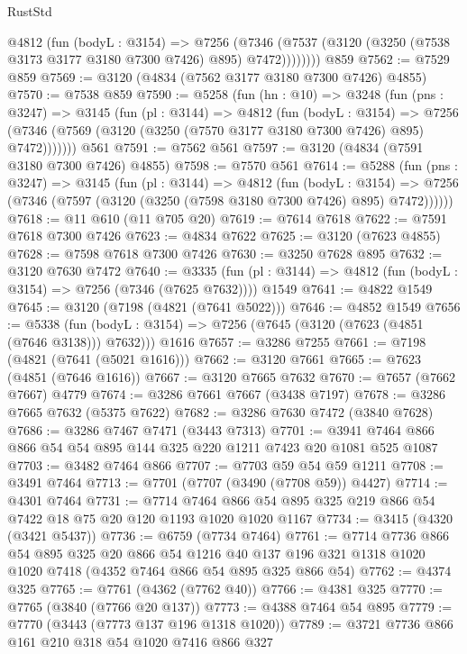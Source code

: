 \begin{lexlean}{RustStd}
\begin{coremodule}
{\begin{coremodule}
{{{{{{{{{{{{{{{{{{{{{{{{{{          @4812
            (fun (bodyL : @3154) =>
            @7256
              (@7346 (@7537 (@3120 (@3250 (@7538 @3173 @3177 @3180 @7300 @7426) @895) @7472))))))))
    @859
@7562 := @7529 @859
@7569 := @3120 (@4834 (@7562 @3177 @3180 @7300 @7426) @4855)
@7570 := @7538 @859
@7590 := @5258
    (fun (hn : @10) =>
    @3248
      (fun (pns : @3247) =>
      @3145
        (fun (pl : @3144) =>
        @4812
          (fun (bodyL : @3154) =>
          @7256 (@7346 (@7569 (@3120 (@3250 (@7570 @3177 @3180 @7300 @7426) @895) @7472)))))))
    @561
@7591 := @7562 @561
@7597 := @3120 (@4834 (@7591 @3180 @7300 @7426) @4855)
@7598 := @7570 @561
@7614 := @5288
    (fun (pns : @3247) =>
    @3145
      (fun (pl : @3144) =>
      @4812
        (fun (bodyL : @3154) =>
        @7256 (@7346 (@7597 (@3120 (@3250 (@7598 @3180 @7300 @7426) @895) @7472))))))
@7618 := @11 @610 (@11 @705 @20)
@7619 := @7614 @7618
@7622 := @7591 @7618 @7300 @7426
@7623 := @4834 @7622
@7625 := @3120 (@7623 @4855)
@7628 := @7598 @7618 @7300 @7426
@7630 := @3250 @7628 @895
@7632 := @3120 @7630 @7472
@7640 := @3335
    (fun (pl : @3144) => @4812 (fun (bodyL : @3154) => @7256 (@7346 (@7625 @7632))))
    @1549
@7641 := @4822 @1549
@7645 := @3120 (@7198 (@4821 (@7641 @5022)))
@7646 := @4852 @1549
@7656 := @5338
    (fun (bodyL : @3154) => @7256 (@7645 (@3120 (@7623 (@4851 (@7646 @3138))) @7632)))
    @1616
@7657 := @3286 @7255
@7661 := @7198 (@4821 (@7641 (@5021 @1616)))
@7662 := @3120 @7661
@7665 := @7623 (@4851 (@7646 @1616))
@7667 := @3120 @7665 @7632
@7670 := @7657 (@7662 @7667) @4779
@7674 := @3286 @7661 @7667 (@3438 @7197)
@7678 := @3286 @7665 @7632 (@5375 @7622)
@7682 := @3286 @7630 @7472 (@3840 @7628)
@7686 := @3286 @7467 @7471 (@3443 @7313)
@7701 := @3941 @7464 @866 @866 @54 @54 @895 @144 @325 @220 @1211 @7423 @20 @1081 @525 @1087
@7703 := @3482 @7464 @866
@7707 := @7703 @59 @54 @59 @1211
@7708 := @3491 @7464
@7713 := @7701 (@7707 (@3490 (@7708 @59)) @4427)
@7714 := @4301 @7464
@7731 := @7714 @7464 @866 @54 @895 @325 @219 @866 @54 @7422 @18 @75 @20 @120 @1193 @1020 @1020 @1167
@7734 := @3415 (@4320 (@3421 @5437))
@7736 := @6759 (@7734 @7464)
@7761 := @7714
    @7736
    @866
    @54
    @895
    @325
    @20
    @866
    @54
    @1216
    @40
    @137
    @196
    @321
    @1318
    @1020
    @1020
    @7418
    (@4352 @7464 @866 @54 @895 @325 @866 @54)
@7762 := @4374 @325
@7765 := @7761 (@4362 (@7762 @40))
@7766 := @4381 @325
@7770 := @7765 (@3840 (@7766 @20 @137))
@7773 := @4388 @7464 @54 @895
@7779 := @7770 (@3443 (@7773 @137 @196 @1318 @1020))
@7789 := @3721 @7736 @866 @161 @210 @318 @54 @1020 @7416 @866 @327
}}}}}}}}}}}}}}}}}}}}}}}}}}
\end{coremodule}}
\end{coremodule}
\end{lexlean}
